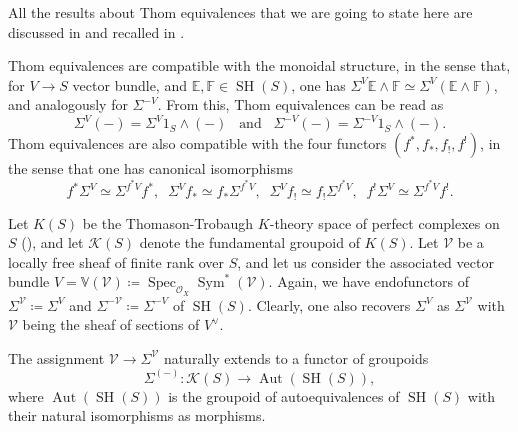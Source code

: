 \documentclass[10pt]{amsart}
\theoremstyle{definition}
\theoremstyle{plain}
\numberwithin{equation}{section}
\newcommand{\0}{\emptyset}
\newcommand{\sK}{{\mathcal K}}
\newcommand{\sV}{{\mathcal V}}
\newcommand{\E}{{\mathbb E}}
\newcommand{\F}{{\mathbb F}}
\newcommand{\V}{{\mathbb V}}
\newcommand{\Spec}{{\operatorname{Spec}}}
\newcommand{\SH}{{\operatorname{SH}}}
\newcommand{\Aut}{{\operatorname{Aut}}}
\newcommand{\Sym}{{\operatorname{Sym}}}
\begin{document}
All the results about Thom equivalences that we are going to state here are discussed in \cite[Section 1.5]{ayoub:sixfunctors} and recalled in \cite[Section 2.1]{deglise-jin-khan}.

Thom equivalences are compatible with the monoidal structure, in the sense that, for $V\to S$ vector bundle, and $\E,\F \in \SH(S)$, one has $\Sigma^V\E \wedge \F \simeq \Sigma^V(\E \wedge \F)$, and analogously for $\Sigma^{-V}$. From this, Thom equivalences can be read as
$$\Sigma^V(-)=\Sigma^V1_S \wedge (-) \; \; \; \text{and} \; \; \; \Sigma^{-V}(-)=\Sigma^{-V}1_S \wedge (-).$$
Thom equivalences are also compatible with the four functors $(f^*,f_*,f_!,f^!)$, in the sense that one has canonical isomorphisms
\begin{equation}
\label{eq:thomcompatibilities}
    f^*\Sigma^V \simeq \Sigma^{f^*V}f^*, \; \; \Sigma^Vf_* \simeq f_*\Sigma^{f^*V}, \; \; \Sigma^Vf_! \simeq f_!\Sigma^{f^*V}, \; \; f^!\Sigma^V \simeq \Sigma^{f^*V}f^!.
\end{equation}

Let $K(S)$ be the Thomason-Trobaugh $K$-theory space of perfect complexes on $S$ (\cite[Definition 3.1]{Thomason:K-theory}), and let $\sK(S)$ denote the fundamental groupoid of $K(S)$. Let $\sV$ be a locally free sheaf of finite rank over $S$, and let us consider the associated vector bundle $V =\V(\sV) \coloneqq \Spec_{\mathcal{O}_X}\Sym^*(\sV)$. Again, we have endofunctors of $\Sigma^\sV \coloneqq \Sigma^V$ and $\Sigma^{-\sV}\coloneqq \Sigma^{-V}$ of $\SH(S)$. Clearly, one also recovers $\Sigma^V$ as $\Sigma^\sV$ with $\sV$ being the sheaf of sections of $V^\vee$.

The assignment $\sV \to \Sigma^\sV$ naturally extends to a functor of groupoids
\begin{equation}
    \label{eq:SigmaFunctorOfGroupoids}
    \Sigma^{(-)}: \sK(S) \to \Aut(\SH(S)),
\end{equation}
where $\Aut(\SH(S))$ is the groupoid of autoequivalences of $\SH(S)$ with their natural isomorphisms as morphisms.
\end{document}
